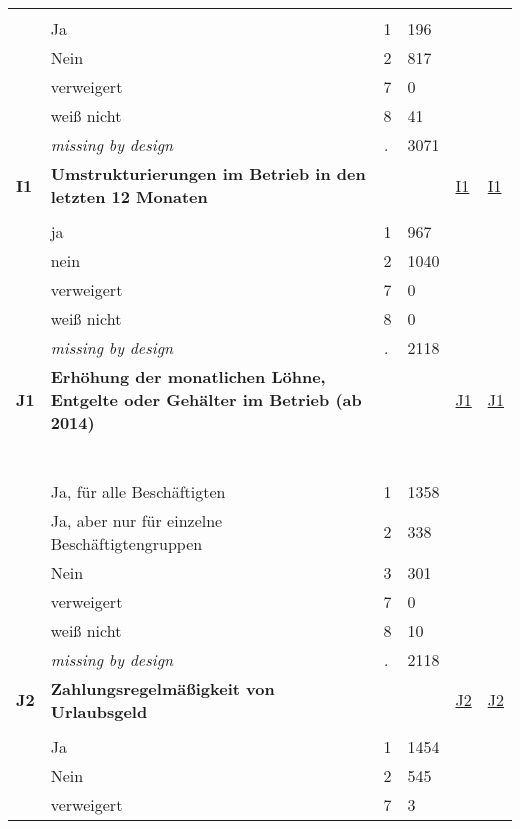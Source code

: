 \begin{longtable}{| L{2.45cm} | L{6cm} | C{1.5cm} | R{1cm} | C{2.25cm} | C{2.25cm} |}
   &  &  &  &  &  \\ 
   & Ja & 1 & 196 &  &  \\ 
   & Nein & 2 & 817 &  &  \\ 
   & verweigert & 7 & 0 &  &  \\ 
   & weiß nicht & 8 & 41 &  &  \\ 
   & \textit{missing by design} & \textit{.} & 3071 &  &  \\ 
   \midrule
\textbf{I1}\label{var:I1} & \textbf{Umstrukturierungen im Betrieb in den letzten 12 Monaten} &  &  & \hyperref[I1]{I1} & \hyperref[var:suf:I1]{I1} \\ 
   &  &  &  &  &  \\ 
   & ja & 1 & 967 &  &  \\ 
   & nein & 2 & 1040 &  &  \\ 
   & verweigert & 7 & 0 &  &  \\ 
   & weiß nicht & 8 & 0 &  &  \\ 
   & \textit{missing by design} & \textit{.} & 2118 &  &  \\ 
   \midrule
\textbf{J1}\label{var:J1} & \textbf{Erhöhung der monatlichen Löhne, Entgelte oder Gehälter im Betrieb (ab 2014)} &  &  & \hyperref[J1]{J1} & \hyperref[var:suf:J1]{J1} \\ 
   & \protect\subsection[Variablen J1 bis K6]{} &  &  &  &  \\ 
   & Ja, für alle Beschäftigten & 1 & 1358 &  &  \\ 
   & Ja, aber nur für einzelne Beschäftigtengruppen & 2 & 338 &  &  \\ 
   & Nein & 3 & 301 &  &  \\ 
   & verweigert & 7 & 0 &  &  \\ 
   & weiß nicht & 8 & 10 &  &  \\ 
   & \textit{missing by design} & \textit{.} & 2118 &  &  \\ 
   \midrule
\textbf{J2}\label{var:J2} & \textbf{Zahlungsregelmäßigkeit von Urlaubsgeld} &  &  & \hyperref[J2]{J2} & \hyperref[var:suf:J2]{J2} \\ 
   &  &  &  &  &  \\ 
   & Ja & 1 & 1454 &  &  \\ 
   & Nein & 2 & 545 &  &  \\ 
   & verweigert & 7 & 3 &  &  \\ 

\end{longtable}
